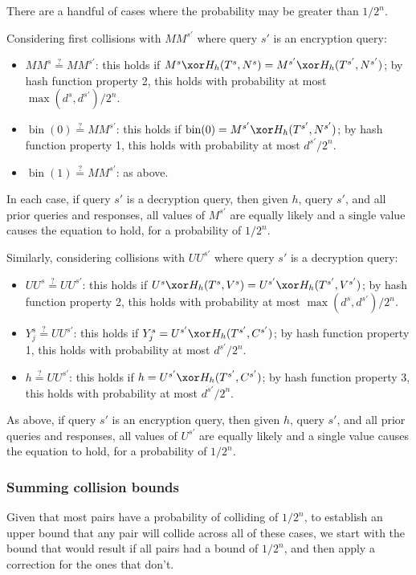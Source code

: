 \documentclass[letterpaper,11pt]{article}
\newcommand*{\MM}{\mathit{MM}}
\newcommand*{\qeq}{\stackrel{\text{?}}{=}}
\newcommand*{\UU}{\mathit{UU}}
\DeclareMathOperator{\fromint}{bin}
\begin{document}
There are a handful of cases where the probability may
be greater than \(1/2^n\).

Considering first collisions with \(\MM^{s'}\) where
query \(s'\) is an encryption query:

\begin{itemize}
    \item \(\MM^s \qeq \MM^{s'}\):
    this holds if \(M^s \xor H_h(T^s, N^s) = M^{s'} \xor H_h(T^{s'}, N^{s'})\);
    by hash function property 2, this holds with probability at most
    \(\max(d^s, d^{s'})/2^n\).
    \item \(\fromint(0) \qeq \MM^{s'}\):
    this holds if \(\fromint(0) = M^{s'} \xor H_h(T^{s'}, N^{s'})\);
    by hash function property 1, this holds with probability at most
    \(d^{s'}/2^n\).
    \item \(\fromint(1) \qeq \MM^{s'}\): as above.
\end{itemize}

In each case, if query \(s'\) is a decryption query,
then given \(h\), query \(s'\), and all prior
queries and responses, all values of \(M^{s'}\)
are equally likely and a single value causes
the equation to hold, for a probability of
\(1/2^n\).

Similarly, considering collisions with \(\UU^{s'}\) where
query \(s'\) is a decryption query:

\begin{itemize}
    \item \(\UU^s \qeq \UU^{s'}\): 
    this holds if \(U^s \xor H_h(T^s, V^s) = U^{s'} \xor H_h(T^{s'}, V^{s'})\);
    by hash function property 2, this holds with probability at most
    \(\max(d^s, d^{s'})/2^n\).
    \item \(Y_j^s \qeq \UU^{s'}\):
    this holds if \(Y_j^s = U^{s'} \xor H_h(T^{s'}, C^{s'})\);
    by hash function property 1, this holds with probability at most
    \(d^{s'}/2^n\).
    \item \(h \qeq \UU^{s'}\):
    this holds if \(h = U^{s'} \xor H_h(T^{s'}, C^{s'})\);
    by hash function property 3, this holds with probability at most
    \(d^{s'}/2^n\).
\end{itemize}

As above, if query \(s'\) is an encryption query,
then given \(h\), query \(s'\), and all prior
queries and responses, all values of \(U^{s'}\)
are equally likely and a single value causes
the equation to hold, for a probability of
\(1/2^n\).

\subsubsection{Summing collision bounds}
Given that most pairs have a probability of
colliding of \(1/2^n\), 
to establish an upper bound that any pair
will collide across all of these cases,
we start with the bound that would result
if all pairs had a bound of \(1/2^n\),
and then apply a correction for the ones that don't.
\end{document}
